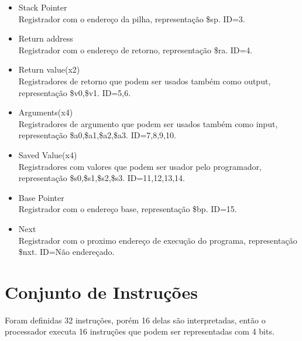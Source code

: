 \documentclass[a4paper, 10pt]{article}
\begin{document}
\begin{itemize}
	\item 	Stack Pointer\\
	Registrador com o endereço da pilha, representação \$sp. ID=3.
	\item Return address\\
	Registrador com o endereço de retorno, representação \$ra. ID=4.
	\item Return value(x2)\\
	Registradores de retorno que podem ser usados também como output, representação \$v0,\$v1. ID=5,6.
	\item Arguments(x4)\\
	Registradores de argumento que podem ser usados também como input, representação \$a0,\$a1,\$a2,\$a3. ID=7,8,9,10.
	\item Saved Value(x4)\\
	Registradores com valores que podem ser usador pelo programador, representação \$s0,\$s1,\$s2,\$s3. ID=11,12,13,14.
	\item Base Pointer\\
	Registrador com o endereço base, representação \$bp. ID=15.
	\item Next\\
	Registrador com o proximo endereço de execução do programa, representação \$nxt. ID=Não endereçado.
\end{itemize}
\newpage
\section{Conjunto de Instruções}
Foram definidas 32 instruções, porém 16 delas são interpretadas, então o processador executa 16 instruções que podem ser representadas com 4 bits.
\end{document}
